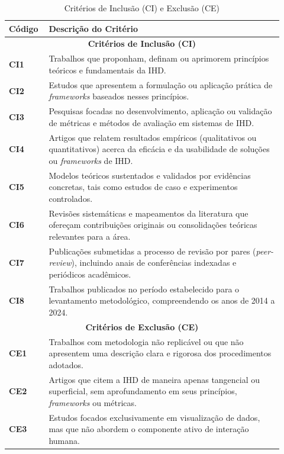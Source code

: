 \documentclass[12pt]{article}
\begin{document}
\begin{table}[H]
\centering
\caption{Critérios de Inclusão (CI) e Exclusão (CE)}
\label{tab:criterios}
\scriptsize
\renewcommand{\arraystretch}{0.85}
\begin{tabular}{p{0.12\linewidth} p{0.8\linewidth}}
\hline
\textbf{Código} & \textbf{Descrição do Critério} \\
\hline
\multicolumn{2}{c}{\textbf{Critérios de Inclusão (CI)}} \\
\hline
\textbf{CI1} & Trabalhos que proponham, definam ou aprimorem princípios teóricos e fundamentais da IHD. \\
\textbf{CI2} & Estudos que apresentem a formulação ou aplicação prática de \textit{frameworks} baseados nesses princípios. \\
\textbf{CI3} & Pesquisas focadas no desenvolvimento, aplicação ou validação de métricas e métodos de avaliação em sistemas de IHD. \\
\textbf{CI4} & Artigos que relatem resultados empíricos (qualitativos ou quantitativos) acerca da eficácia e da usabilidade de soluções ou \textit{frameworks} de IHD. \\
\textbf{CI5} & Modelos teóricos sustentados e validados por evidências concretas, tais como estudos de caso e experimentos controlados. \\
\textbf{CI6} & Revisões sistemáticas e mapeamentos da literatura que ofereçam contribuições originais ou consolidações teóricas relevantes para a área. \\
\textbf{CI7} & Publicações submetidas a processo de revisão por pares (\textit{peer-review}), incluindo anais de conferências indexadas e periódicos acadêmicos. \\
\textbf{CI8} & Trabalhos publicados no período estabelecido para o levantamento metodológico, compreendendo os anos de 2014 a 2024. \\
\hline
\multicolumn{2}{c}{\textbf{Critérios de Exclusão (CE)}} \\
\hline
\textbf{CE1} & Trabalhos com metodologia não replicável ou que não apresentem uma descrição clara e rigorosa dos procedimentos adotados. \\
\textbf{CE2} & Artigos que citem a IHD de maneira apenas tangencial ou superficial, sem aprofundamento em seus princípios, \textit{frameworks} ou métricas. \\
\textbf{CE3} & Estudos focados exclusivamente em visualização de dados, mas que não abordem o componente ativo de interação humana. \\

\end{tabular}
\end{table}
\end{document}
